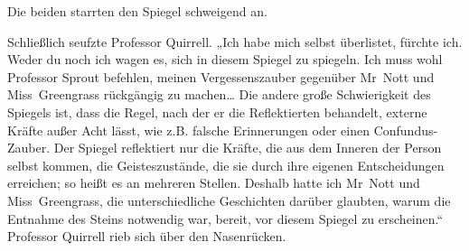 Die beiden starrten den Spiegel schweigend an.

Schließlich seufzte Professor Quirrell. „Ich habe mich selbst überlistet, fürchte ich. Weder du noch ich wagen es, sich in diesem Spiegel zu spiegeln. Ich muss wohl Professor Sprout befehlen, meinen Vergessenszauber gegenüber Mr~Nott und Miss~Greengrass rückgängig zu machen… Die andere große Schwierigkeit des Spiegels ist, dass die Regel, nach der er die Reflektierten behandelt, externe Kräfte außer Acht lässt, wie z.B. falsche Erinnerungen oder einen Confundus-Zauber. Der Spiegel reflektiert nur die Kräfte, die aus dem Inneren der Person selbst kommen, die Geisteszustände, die sie durch ihre eigenen Entscheidungen erreichen; so heißt es an mehreren Stellen. Deshalb hatte ich Mr~Nott und Miss~Greengrass, die unterschiedliche Geschichten darüber glaubten, warum die Entnahme des Steins notwendig war, bereit, vor diesem Spiegel zu erscheinen.“
Professor Quirrell rieb sich über den Nasenrücken.
